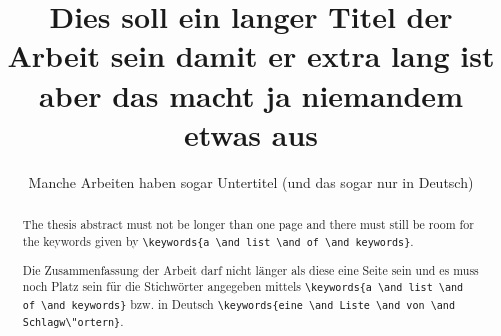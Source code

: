 \documentclass[online,a4paper,phd]{isw}
\begin{document}
    \frontmatter
    
    \maketitle
    
    \begin{otherlanguage}{ngerman}
        \title{Dies soll ein langer Titel der Arbeit sein damit er extra lang ist aber das macht ja niemandem etwas aus}
        \subtitle{Manche Arbeiten haben sogar Untertitel (und das sogar nur in Deutsch)}
        
        \maketitle
    \end{otherlanguage}
    
    
    \DeclarationOfAuthorship
    
    \begin{abstract}
        The thesis abstract must not be longer than one page and there must still be room for the keywords given by \lstinline!\keywords{a \and list \and of \and keywords}!.
        
        \lipsum[1-3]
    \end{abstract}
    
    \begin{otherlanguage}{ngerman}
        \begin{abstract}
            Die Zusammenfassung der Arbeit darf nicht l\"anger als diese eine Seite sein und es muss noch Platz sein f\"ur die Stichw\"orter angegeben mittels \lstinline!\keywords{a \and list \and of \and keywords}! bzw. in Deutsch \lstinline!\keywords{eine \and Liste \and von \and Schlagw\"ortern}!.
            
            \lipsum[4-6]
            
        \end{abstract}
    \end{otherlanguage}
    
\end{document}
